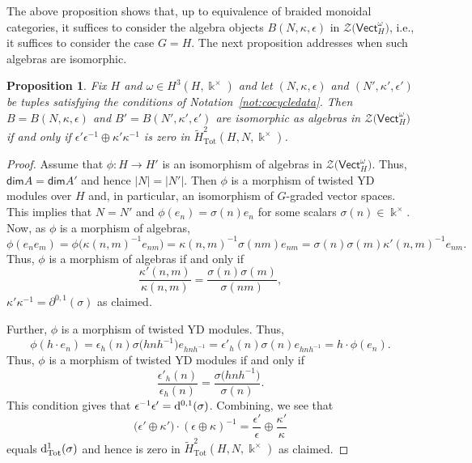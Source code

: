 \documentclass[10pt,a4paper]{amsart}
\numberwithin{equation}{section}
\newtheorem{Proposition}[Theorem]{Proposition}
 { \theoremstyle{definition}
\newtheorem{Definition}[Theorem]{Definition}
\newtheorem{Note}[Theorem]{Note}
\newtheorem{Notation}[Theorem]{Notation}
\newtheorem{Example}[Theorem]{Example}
\newtheorem{Remark}[Theorem]{Remark} }
\newcommand{\deri}{{\rm d}}
\newcommand{\Tot}{\mathrm{Tot}}
\renewcommand{\dim}{\mathsf{dim}}
\newcommand{\Vect}{\mathsf{Vect}}
\newcommand{\cZ}{\mathcal{Z}}
\begin{document}
The above proposition shows that, up to equivalence of braided monoidal categories, it suffices to consider the algebra objects $B(N,\kappa,\epsilon)$ in $\cZ\big(\Vect_H^\omega\big)$, i.e., it suffices to consider the case $G=H$. The next proposition addresses when such algebras are isomorphic.

\begin{Proposition} %
Fix $H$ and $\omega\in H^3(H,\Bbbk^\times)$ and let $(N,\kappa,\epsilon)$ and $(N',\kappa',\epsilon')$ be tuples satisfying the conditions of Notation~{\rm \ref{not:cocycledata}}. Then $B=B(N,\kappa,\epsilon)$ and $B'=B(N',\kappa',\epsilon')$ are isomorphic as algebras in $\cZ\big(\Vect_H^\omega\big)$ if and only if $\epsilon'\epsilon^{-1}\oplus \kappa'\kappa^{-1}$ is zero in $\widetilde{H}^2_{\Tot}(H,N,\Bbbk^\times)$.
\end{Proposition}
\begin{proof}
Assume that $\phi\colon H\to H'$ is an isomorphism of algebras in $\cZ\big(\Vect_H^\omega\big)$. Thus, $\dim A=\dim A'$ and hence $|N|=|N'|$.
Then $\phi$ is a morphism of twisted YD modules over $H$ and, in particular, an isomorphism of $G$-graded vector spaces.
This implies that $N=N'$ and $\phi(e_n)=\sigma(n) e_n$ for some scalars $\sigma(n)\in \Bbbk^\times$. Now, as $\phi$ is a morphism of algebras,
\[\phi(e_{n}e_{m})=\phi\big(\kappa(n,m)^{-1}e_{nm}\big)=\kappa(n,m)^{-1}\sigma(nm)e_{nm}=\sigma(n)\sigma(m)\kappa'(n,m)^{-1}e_{nm}.\]
Thus, $\phi$ is a morphism of algebras if and only if
\[\frac{\kappa'(n,m)}{\kappa(n,m)}=\frac{\sigma(n)\sigma(m)}{\sigma(nm)},\]
$\kappa'\kappa^{-1}=\partial^{0,1}(\sigma)$ as claimed.

Further, $\phi$ is a morphism of twisted YD modules. Thus,
\[\phi(h\cdot e_n)=\epsilon_h(n)\sigma\big(hnh^{-1}\big)e_{hnh^{-1}}=\epsilon'_h(n)\sigma(n)e_{hnh^{-1}}=h\cdot \phi(e_n).\]
Thus, $\phi$ is a morphism of twisted YD modules if and only if
\[\frac{\epsilon'_h(n)}{\epsilon_h(n)}=\frac{\sigma\big(hnh^{-1}\big)}{\sigma(n)}.\]
This condition gives that $\epsilon^{-1}\epsilon'=\deri^{0,1}(\sigma)$. Combining, we see that
 \[\big(\epsilon'\oplus \kappa'\big)\cdot (\epsilon\oplus \kappa)^{-1}=\frac{\epsilon'}{\epsilon}\oplus \frac{\kappa'}{\kappa} \]
equals $\deri^{1}_{\Tot}(\sigma)$ and hence is zero in $\widetilde{H}^2_{\Tot}(H,N,\Bbbk^\times)$ as claimed.
\end{proof}
\end{document}

